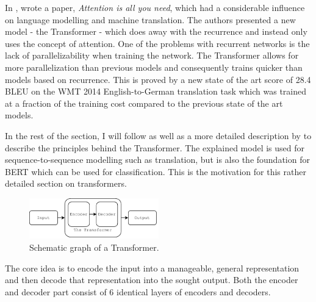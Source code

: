 In \citeyear{NIPS2017_7181}, \citeauthor{NIPS2017_7181} wrote a paper, \textit{Attention is all you need}, which had a considerable influence on language modelling and machine translation. The authors presented a new model - the Transformer - which does away with the recurrence and instead only uses the concept of  attention. One of the problems with recurrent networks is the lack of parallelizability when training the network. The Transformer allows for more parallelization than previous models and consequently trains quicker than models based on recurrence. This is proved by a new state of the art score of 28.4 BLEU on the WMT 2014 English-to-German translation task which was trained at a fraction of the training cost compared to the previous state of the art models. 


In the rest of the section, I will follow \citet{NIPS2017_7181} as well as a more detailed description by \citet{jayalammar2018} to describe the principles behind the Transformer. The explained model is used for sequence-to-sequence modelling such as translation, but is also the foundation for BERT which can be used for classification. This is the motivation for this rather detailed section on transformers. 

\begin{figure}[H]
    \centering
    \includegraphics[width=0.5\textwidth]{Figures/figs-transformer.pdf}
    \caption{Schematic graph of a Transformer.}
    \label{fig:trfo}
\end{figure}

The core idea is to encode the input into a manageable, general representation and then decode that representation into the sought output. Both the encoder and decoder part consist of 6 identical layers of encoders and decoders.

